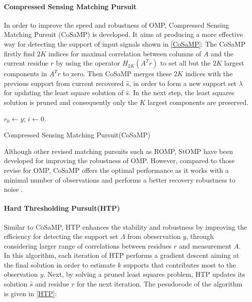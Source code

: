 \paragraph{Compressed Sensing Matching Pursuit}
In order to improve the speed and robustness of OMP, Compressed Sensing Matching Pursuit (CoSaMP)\cite{needell2009cosamp} is developed. It aims at producing a more effective way for detecting the support of input signals shown in \ref{CoSaMP}: The CoSaMP firstly find $2K$ indices for maximal correlation between columns of $A$ and the current residue $r$ by using the operator $H_{2K}(A^T r)$ to set all but the $2K$ largest components in $A^T r$ to zero. Then CoSaMP merges these $2K$ indices with the previous support from current recovered $\hat s$, in order to form a new support set $\lambda$ for updating the least square solution of $\hat s$. In the next step, the least squares solution is pruned and consequently only the $K$ largest components are preserved.  

\IncMargin{1em}
\begin{algorithm}
    \BlankLine
	$r_0 \gets y$; $i \gets 0$. \;
\caption{Compressed Sensing Matching Pursuit(CoSaMP)}\label{CoSaMP}
\end{algorithm}
\DecMargin{1em}

Although other revised matching pursuits such as ROMP\cite{needell2009uniform}, StOMP\cite{donoho2006sparse} have been developed for improving the robustness of OMP. However, compared to those revise for OMP, CoSaMP offers the optimal performance as it works with a minimal number of observations and performs a better recovery robustness to noise \cite{needell2009cosamp}.

\paragraph{Hard Thresholding Pursuit(HTP)}
Similar to CoSaMP, HTP enhances the stability and robustness by improving the efficiency for detecting the support set $\Lambda$ from obeservation $y$, through considering larger range of correlations between residues $r$ and measurement $A$\cite{foucart2011hard}. In this algorithm, each iteration of HTP performs a gradient descent aiming at the final solution in order to estimate $k$ supports that contributes most to the observation $y$. Next, by solving a pruned least squares problem, HTP updates its solution $\hat s$ and residue $r$ for the next iteration. The pesudocode of the algorithm is given in \ref{HTP}: 

